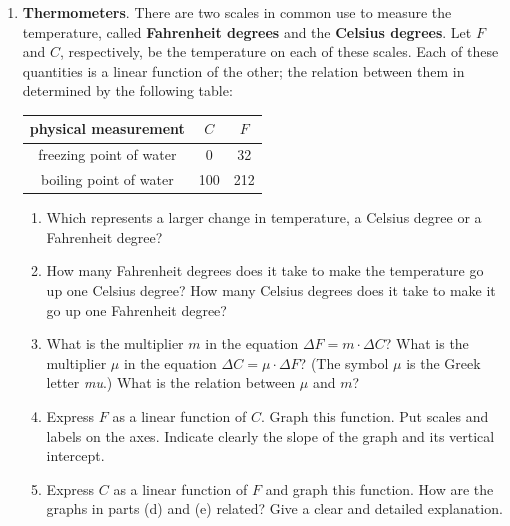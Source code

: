 \begin{enumerate}
  \begin{enumerate}
  \item Find a formula to express $\Delta q$ as a function of $\Delta p$,
and another to express $q$ as a function of $p$.


\end{enumerate}
\item {\bf Thermometers}. There are two scales in
common use to measure the temperature, called {\bf Fahrenheit degrees}
and the {\bf Celsius degrees}. Let
$F$ and $C$, respectively, be the temperature on each of these scales.
Each of these quantities is a linear function of the other; the
relation between them in determined by the following table:
\begin{center}


\begin{tabular}{ccc}
	physical measurement & $C$ & $F$ \\ [1pt] \hline
	freezing point of water & 
		\rule{0pt}{14pt} 0 \rule{0pt}{14pt} & 32 \\
	boiling point of water & 100 & 212 
	\end{tabular}
\end{center}


  \begin{enumerate}
  \item Which represents a larger change in temperature, a Celsius degree
or a Fahrenheit degree?

  \item How many Fahrenheit degrees does it take to make the temperature
go up one Celsius degree?  How many Celsius degrees does it take to
make it go up one Fahrenheit degree?

  \item What is the multiplier $m$ in the equation $\Delta F = m \cdot
\Delta C$?  What is the multiplier $\mu$ in the equation $\Delta C =
\mu \cdot \Delta F$?  (The symbol $\mu$ is the Greek letter {\em mu}.)
What is the relation between $\mu$ and $m$?

  \item Express $F$ as a linear function of $C$.  Graph this function.
Put scales and labels on the axes.  Indicate clearly the slope of the
graph and its vertical intercept.

  \item Express $C$ as a linear function of $F$ and graph this function.
How are the graphs in parts (d) and (e) related?  Give a clear and
detailed explanation.


\end{enumerate}
\end{enumerate}
